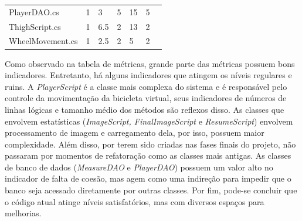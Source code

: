 \begin{table}[htp]
\begin{tabular}{lllllll}
PlayerDAO.cs & 1\cellcolor[HTML]{9AFF99} & 3\cellcolor[HTML]{9AFF99} & 5\cellcolor[HTML]{FFCE93} & 15\cellcolor[HTML]{9AFF99} & 5\cellcolor[HTML]{9AFF99} \\
ThighScript.cs & 1\cellcolor[HTML]{9AFF99} & 6.5\cellcolor[HTML]{9AFF99} & 2\cellcolor[HTML]{FFFC9E} & 13\cellcolor[HTML]{9AFF99} & 2\cellcolor[HTML]{9AFF99} \\
WheelMovement.cs & 1\cellcolor[HTML]{9AFF99} & 2.5\cellcolor[HTML]{9AFF99} & 2\cellcolor[HTML]{FFFC9E} & 5\cellcolor[HTML]{9AFF99} & 2\cellcolor[HTML]{9AFF99} \\\hline
\end{tabular}
\end{table}

Como observado na tabela de métricas, grande parte das métricas possuem bons indicadores. Entretanto, há alguns indicadores que atingem os níveis regulares e ruins. A \textit{PlayerScript} é a classe mais complexa do sistema e é responsável pelo controle da movimentação da bicicleta virtual, seus indicadores de números de linhas lógicas e tamanho médio dos métodos são reflexos disso. As classes que envolvem estatísticas (\textit{ImageScript, FinalImageScript} e \textit{ResumeScript}) envolvem processamento de imagem e carregamento dela, por isso, possuem maior complexidade. Além disso, por terem sido criadas nas fases finais do projeto, não passaram por momentos de refatoração como as classes mais antigas. As classes de banco de dados (\textit{MeasureDAO} e \textit{PlayerDAO}) possuem um valor alto no indicador de falta de coesão, mas agem como uma indireção para impedir que o banco seja acessado diretamente por outras classes. Por fim, pode-se concluir que o código atual atinge níveis satisfatórios, mas com diversos espaços para melhorias.

